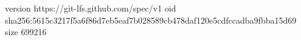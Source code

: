 version https://git-lfs.github.com/spec/v1
oid sha256:5615c3217f5a6f86d7eb5eaf7b028589cb478daf120e5cdfccadba9fbba15d69
size 699216
